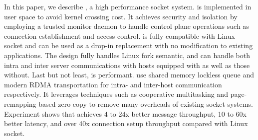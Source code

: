 In this paper, we describe \sys{}, a high performance socket system. \sys{} is implemented in user space to avoid kernel crossing cost. 
It achieves security and isolation by employing a trusted monitor daemon to handle control plane operations such as connection establishment and access control. 
\sys{} is fully compatible with Linux socket and can be used as a drop-in replacement with no modification to existing applications. The design fully
handles Linux fork semantic, and can handle both intra and inter server communications with hosts equipped with \sys{} as well as those without. 
Last but not least, \sys{} is performant. \sys{} use shared memory lockless queue and modern RDMA transportation for intra- and inter-host communication respectively. 
It leverages techniques such as cooperative multitasking and page-remapping based zero-copy to remove many overheads of existing socket systems.
Experiment shows that \sys achieves 4 to 24x better message throughput, 10 to 60x better latency, and over 40x connection setup throughput compared with Linux socket.

